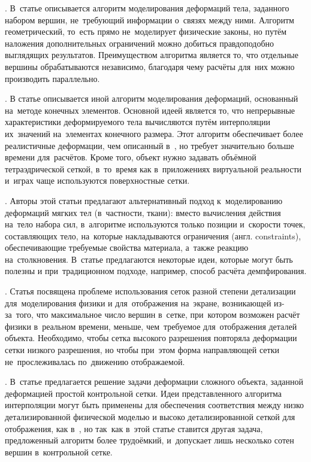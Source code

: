\documentclass[a4paper,11pt]{report}
\begin{document}
    \cite[Meshless Deformations...]{mueller-meshless}. В~статье описывается алгоритм
      моделирования деформаций тела, заданного набором вершин, не~требующий информации о~связях
      между ними. Алгоритм геометрический, то~есть прямо не~моделирует физические законы, но путём
      наложения дополнительных ограничений можно добиться правдоподобно выглядящих результатов.
      Преимуществом алгоритма является то, что отдельные вершины обрабатываются независимо,
      благодаря чему расчёты для~них можно производить параллельно.

    \cite[Stable Real-Time Deformations]{mueller-stable}. В статье описывается иной алгоритм
      моделирования деформаций, основанный на~методе конечных элементов. Основной идеей является то,
      что непрерывные характеристики деформируемого тела вычисляются путём интерполяции их~значений
      на~элементах конечного размера. Этот алгоритм обеспечивает более реалистичные деформации, чем
      описанный в~\cite{mueller-meshless}, но требует значительно больше времени для~расчётов. Кроме
      того, объект нужно задавать объёмной тетраэдрической сеткой, в~то~время как в~приложениях
      виртуальной реальности и~играх чаще используются поверхностные сетки.

    \cite[Position Based Dynamics]{mueller-position-dynamics}. Авторы этой статьи предлагают
      альтернативный подход к~моделированию деформаций мягких тел (в~частности, ткани): вместо
      вычисления действия на~тело набора сил, в~алгоритме используются только позиции и~скорости
      точек, составляющих тело, на~которые накладываются ограничения (англ. {\English constraints}),
      обеспечивающие требуемые свойства материала, а~также реакцию на~столкновения. В~статье
      предлагаются некоторые идеи, которые могут быть полезны и при~традиционном подходе, например,
      способ расчёта демпфирования.

    \cite[Deforming a High-Resolution Mesh...]{visser-mapping}. Статья посвящена проблеме
      использования сеток разной степени детализации для~моделирования физики и для~отображения
      на~экране, возникающей из-за~того, что максимальное число вершин в~сетке, при~котором возможен
      расчёт физики в~реальном времени, меньше, чем~требуемое для~отображения деталей объекта.
      Необходимо, чтобы сетка высокого разрешения повторяла деформации сетки низкого разрешения, но
      чтобы при~этом форма направляющей сетки не~прослеживалась по~движению отображаемой.

    \cite[Efficient Mesh Deformation Using Tetrahedron Control Mesh]{huang-control-mesh}.
      В~статье предлагается решение задачи деформации сложного объекта, заданной деформацией простой
      контрольной сетки. Идеи представленного алгоритма интерполяции могут быть применены для
      обеспечения соответствия между низко детализированной физической моделью и высоко детализированной
      сеткой для отображения, как в~\cite{visser-mapping}, но так~как в~этой статье ставится другая
      задача, предложенный алгоритм более трудоёмкий, и~допускает лишь несколько сотен вершин
      в~контрольной сетке.
\end{document}

